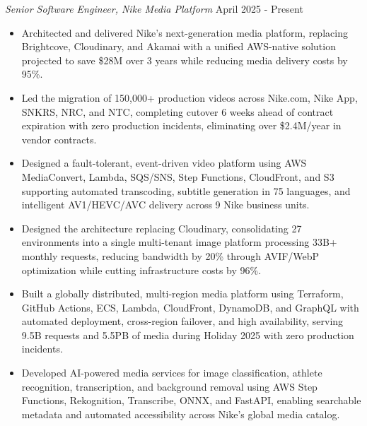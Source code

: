 \documentclass[a4paper]{article}
\begin{document}
\textit{Senior Software Engineer, Nike Media Platform} \hfill April 2025 - Present \\
\vspace{-2mm}
\begin{itemize} \itemsep -1em
    \item Architected and delivered Nike's next-generation media platform, replacing Brightcove, Cloudinary, and Akamai with a unified AWS-native solution projected to save \$28M over 3 years while reducing media delivery costs by 95\%. \\
    \item Led the migration of 150,000+ production videos across Nike.com, Nike App, SNKRS, NRC, and NTC, completing cutover 6 weeks ahead of contract expiration with zero production incidents, eliminating over \$2.4M/year in vendor contracts. \\
    \item Designed a fault-tolerant, event-driven video platform using AWS MediaConvert, Lambda, SQS/SNS, Step Functions, CloudFront, and S3 supporting automated transcoding, subtitle generation in 75 languages, and intelligent AV1/HEVC/AVC delivery across 9 Nike business units. \\
    \item Designed the architecture replacing Cloudinary, consolidating 27 environments into a single multi-tenant image platform processing 33B+ monthly requests, reducing bandwidth by 20\% through AVIF/WebP optimization while cutting infrastructure costs by 96\%. \\
    \item Built a globally distributed, multi-region media platform using Terraform, GitHub Actions, ECS, Lambda, CloudFront, DynamoDB, and GraphQL with automated deployment, cross-region failover, and high availability, serving 9.5B requests and 5.5PB of media during Holiday 2025 with zero production incidents. \\
    \item Developed AI-powered media services for image classification, athlete recognition, transcription, and background removal using AWS Step Functions, Rekognition, Transcribe, ONNX, and FastAPI, enabling searchable metadata and automated accessibility across Nike's global media catalog. \\
\end{itemize}
\end{document}
